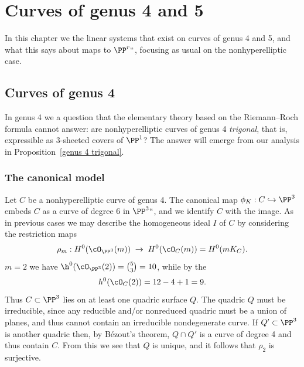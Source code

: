 

\chapter{Curves of genus 4 and 5}\label{genus 4, 5 Chapter}

In this chapter we
the linear systems that exist on curves of genus 4 and 5, and what this says
about maps to $\PP^r` `$, focusing as usual on the nonhyperelliptic case.

\section{Curves of genus 4}

In genus 4 we
a question that the elementary theory based on the Riemann--Roch
formula cannot answer: are nonhyperelliptic curves of genus 4
%
%
\emph{trigonal}, that is, expressible as 3-sheeted covers of $\PP^1$?
The answer will emerge from our analysis in
Proposition~\ref{genus 4 trigonal}.

\subsection*{The canonical model}

Let $C$ be a nonhyperelliptic curve of genus 4. The canonical map $\phi_K : C \hookrightarrow \PP^3$  embeds $C$ as a curve of degree 6 in $\PP^3` `$, and we identify $C$ with the image.  As in previous cases we may describe the homogeneous ideal  $I$ of $C$ by considering the restriction maps
$$
\rho_m : H^0(\cO_{\PP^3}(m)) \; \to \; H^0(\cO_{C}(m)) = H^0(mK_C).
$$
$m=2$ we have $\h^0(\cO_{\PP^3}(2)) = \tbinom{5}{3} = 10$, while by the
%
%
$$
h^0(\cO_C(2)) = 12 - 4 + 1 = 9.
$$
Thus $C \subset \PP^3$  lies on at least one quadric surface $Q$. The quadric $Q$ must be irreducible, since any reducible and/or nonreduced quadric must be a union of planes, and thus cannot contain an irreducible nondegenerate curve.
If $Q'\subset\nobreak \PP^3$ is another quadric then, by B\'ezout's theorem,
$Q\cap Q'$ is a curve of degree 4 and thus
contain $C$. From
this we see that $Q$ is unique, and it follows that $\rho_2$ is surjective.

